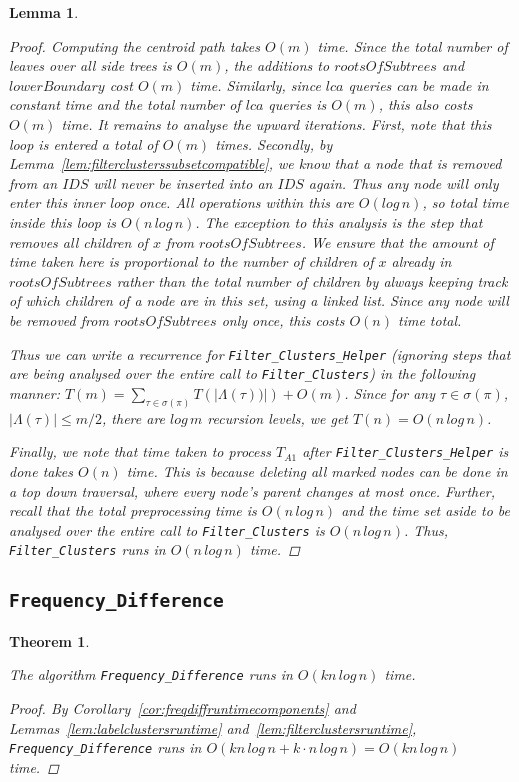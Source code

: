 \documentclass{article}
\newcommand{\leafset}{\Lambda}
\newtheorem{filterclustersruntime}[incompatibility]{Lemma}
\newtheorem{freqdiffruntime}[incompatibility]{Theorem}
\begin{document}
\begin{filterclustersruntime}
\begin{proof}
            Computing the centroid path takes $O(m)$ time. Since the total number of leaves over all side trees is $O(m)$, the additions to $rootsOfSubtrees$ and $lowerBoundary$ cost $O(m)$ time. Similarly, since $lca$ queries can be made in constant time and the total number of $lca$ queries is $O(m)$, this also costs $O(m)$ time. It remains to analyse the upward iterations. First, note that this loop is entered a total of $O(m)$ times. Secondly, by Lemma~\ref{lem:filterclusterssubsetcompatible}, we know that a node that is removed from an $IDS$ will never be inserted into an $IDS$ again. Thus any node will only enter this inner loop once. All operations within this are $O(log\,n)$, so total time inside this loop is $O(n\,log\,n)$. The exception to this analysis is the step that removes all children of $x$ from $rootsOfSubtrees$. We ensure that the amount of time taken here is proportional to the number of children of $x$ already in $rootsOfSubtrees$ rather than the total number of children by always keeping track of which children of a node are in this set, using a linked list. Since any node will be removed from $rootsOfSubtrees$ only once, this costs $O(n)$ time total.

            Thus we can write a recurrence for \texttt{Filter\_Clusters\_Helper} (ignoring steps that are being analysed over the entire call to \texttt{Filter\_Clusters}) in the following manner: $T(m) = \sum_{\tau \in \sigma(\pi)}T(|\leafset(\tau))|) + O(m)$. Since for any $\tau \in \sigma(\pi)$, $|\leafset(\tau)| \leq m/2$, there are $log\,m$ recursion levels, we get $T(n) = O(n\,log\,n)$.

            Finally, we note that time taken to process $T_{A1}$ after \texttt{Filter\_Clusters\_Helper} is done takes $O(n)$ time. This is because deleting all marked nodes can be done in a top down traversal, where every node's parent changes at most once. Further, recall that the total preprocessing time is $O(n\,log\,n)$ and the time set aside to be analysed over the entire call to \texttt{Filter\_Clusters} is $O(n\,log\,n)$. Thus, \texttt{Filter\_Clusters} runs in $O(n\,log\,n)$ time.
        \end{proof}
    \end{filterclustersruntime}

    \subsection{\texttt{Frequency\_Difference}}

    \begin{freqdiffruntime}
        \label{theorem:freqdiffruntime}

        The algorithm \texttt{Frequency\_Difference} runs in $O(kn\,log\,n)$ time.

        \begin{proof}
            By Corollary~\ref{cor:freqdiffruntimecomponents} and Lemmas~\ref{lem:labelclustersruntime} and~\ref{lem:filterclustersruntime}, \texttt{Frequency\_Difference} runs in $O(kn\,log\,n + k \cdot n\,log\,n) = O(kn\,log\,n)$ time.
        \end{proof}
    \end{freqdiffruntime}
\end{document}
